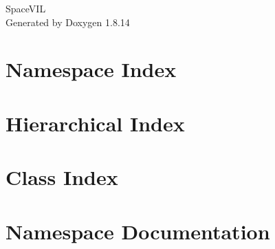 \documentclass[twoside]{book}
\newcommand{\+}{\discretionary{\mbox{\scriptsize$\hookleftarrow$}}{}{}}
\newcommand{\clearemptydoublepage}{%
  \newpage{\pagestyle{empty}\cleardoublepage}%
}
\begin{document}
\hypersetup{pageanchor=false,
             bookmarksnumbered=true,
             pdfencoding=unicode
            }
\begin{titlepage}
\vspace*{7cm}
\begin{center}%
{\Large Space\+V\+IL }\\
\vspace*{1cm}
{\large Generated by Doxygen 1.8.14}\\
\end{center}
\end{titlepage}
\clearemptydoublepage
{}
\tableofcontents
\clearemptydoublepage
{}
\hypersetup{pageanchor=true}

\chapter{Namespace Index}

\chapter{Hierarchical Index}

\chapter{Class Index}

\chapter{Namespace Documentation}




\end{document}
